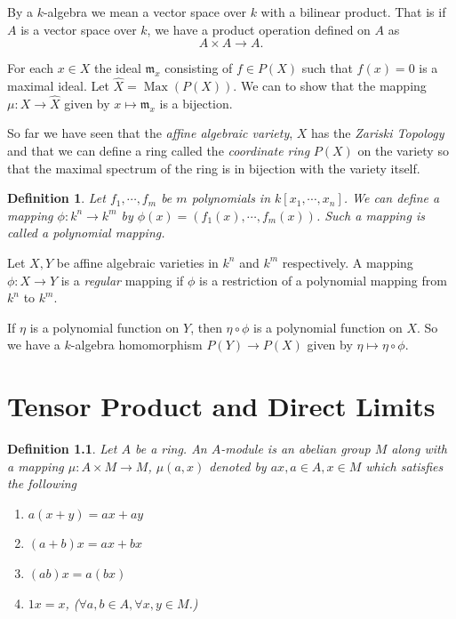 \documentclass[]{report}
\newtheorem{defn}[theorem]{Definition}
\DeclareMathOperator\Max{Max}
\begin{document}
By a $k$-algebra we mean a vector space over $k$ with a bilinear product. That is if $A$ is a vector space over $k$, we have a product operation defined on $A$ as
    $$A \times A \rightarrow A.$$


    For each $x\in X$ the ideal $\mathfrak{m}_x$ consisting of $f\in P(X)$ such that $f(x) = 0$ is a maximal ideal. Let $\hat{X} = \Max(P(X))$. We can to show that the mapping $\mu: X \rightarrow \hat{X}$ given by $x\mapsto \mathfrak{m}_x$ is a bijection.

    So far we have seen that the \textit{affine algebraic variety}, $X$ has the \textit{Zariski Topology} and that we can define a ring called the \textit{coordinate ring} $P(X)$ on the variety so that the maximal spectrum of the ring is in bijection with the variety itself. 


\begin{defn}
    Let $f_1,\cdots, f_m$ be $m$ polynomials in $k[x_1,\cdots,x_n]$. We can define a mapping $\phi: k^n\rightarrow k^m$ by $\phi(x) = (f_1(x),\cdots,f_m(x))$. Such a mapping is called a \textit{polynomial mapping}.
\end{defn}


    Let $X,Y$ be affine algebraic varieties in $k^n$ and $k^m$ respectively. A mapping $\phi: X \rightarrow Y$ is a \textit{regular} mapping if $\phi$ is a restriction of a polynomial mapping from $k^n$ to $k^m$.

    If $\eta$ is a polynomial function on $Y$, then $\eta \circ \phi$ is a polynomial function on $X$. So we have a $k$-algebra homomorphism $P(Y) \rightarrow P(X)$ given by $\eta \mapsto \eta \circ \phi$.

\chapter{Tensor Product and Direct Limits}

\begin{defn}
    Let $A$ be a ring. An $A$-\textit{module} is an abelian group $M$ along with a mapping $\mu: A\times M\rightarrow M$, $\mu(a,x)$ denoted by $ax, a\in A, x\in M$ which satisfies the following
\begin{enumerate}
    \item $a(x+y) = ax + ay$
    \item $(a+b)x = ax + bx$
    \item $(ab)x = a(bx)$
    \item $1x = x$, 
 ($\forall a,b \in A, \forall x,y \in M$.)
\end{enumerate}
\end{defn}
\end{document}
